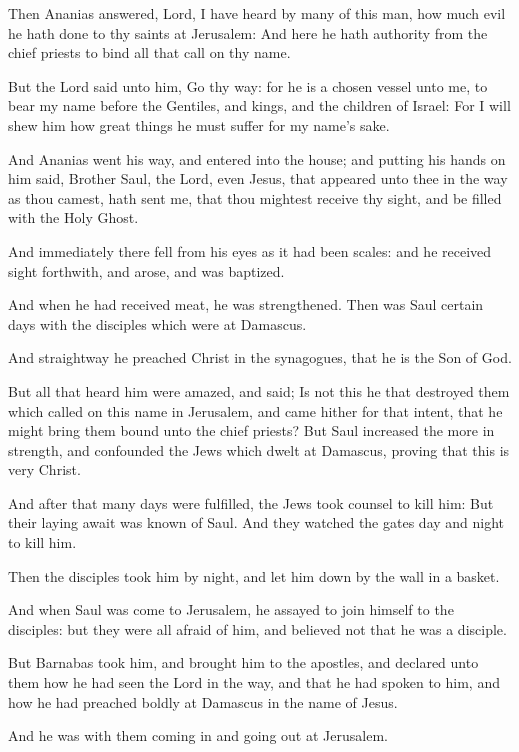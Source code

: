 \Verse Then Ananias answered, Lord, I have heard by many of this man, how much evil he hath done to thy saints at Jerusalem: \Verse And here he hath authority from the chief priests to bind all that call on thy name.

\Verse But the Lord said unto him, Go thy way: for he is a chosen vessel unto me, to bear my name before the Gentiles, and kings, and the children of Israel: \Verse For I will shew him how great things he must suffer for my name's sake.

\Verse And Ananias went his way, and entered into the house; and putting his hands on him said, Brother Saul, the Lord, even Jesus, that appeared unto thee in the way as thou camest, hath sent me, that thou mightest receive thy sight, and be filled with the Holy Ghost.

\Verse And immediately there fell from his eyes as it had been scales: and he received sight forthwith, and arose, and was baptized.

\Verse And when he had received meat, he was strengthened. Then was Saul certain days with the disciples which were at Damascus.

\Verse And straightway he preached Christ in the synagogues, that he is the Son of God.

\Verse But all that heard him were amazed, and said; Is not this he that destroyed them which called on this name in Jerusalem, and came hither for that intent, that he might bring them bound unto the chief priests?  \Verse But Saul increased the more in strength, and confounded the Jews which dwelt at Damascus, proving that this is very Christ.

\Verse And after that many days were fulfilled, the Jews took counsel to kill him: \Verse But their laying await was known of Saul. And they watched the gates day and night to kill him.

\Verse Then the disciples took him by night, and let him down by the wall in a basket.

\Verse And when Saul was come to Jerusalem, he assayed to join himself to the disciples: but they were all afraid of him, and believed not that he was a disciple.

\Verse But Barnabas took him, and brought him to the apostles, and declared unto them how he had seen the Lord in the way, and that he had spoken to him, and how he had preached boldly at Damascus in the name of Jesus.

\Verse And he was with them coming in and going out at Jerusalem.

